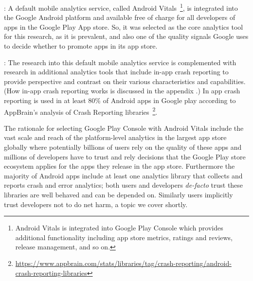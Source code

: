 : A default mobile analytics service, called Android Vitals~\footnote{Android Vitals is integrated into Google Play Console which provides additional functionality including app store metrics, ratings and reviews, release management, and so on.}, is integrated into the Google Android platform and available free of charge for all developers of apps in the Google Play App store. So, it was selected as the core analytics tool for this research, as it is prevalent, and also one of the quality signals Google uses to decide whether to promote apps in its app store. %

: The research into this default mobile analytics service is complemented with research in additional analytics tools that include in-app crash reporting to provide perspective and contrast on their various characteristics and capabilities. (How in-app crash reporting works is discussed in the appendix \href{{app:crash-recording-and-reporting-in-android}}{}.) In app crash reporting is used in at least 80\% of Android apps in Google play according to AppBrain's analysis of Crash Reporting libraries~\footnote{\url{https://www.appbrain.com/stats/libraries/tag/crash-reporting/android-crash-reporting-libraries}}.


The rationale for selecting Google Play Console with Android Vitals include the vast scale and reach of the platform-level analytics in the largest app store globally where potentially billions of users rely on the quality of these apps and millions of developers have to trust and rely decisions that the Google Play store ecosystem applies for the apps they release in the app store. Furthermore the majority of Android apps include at least one analytics library that collects and reports crash and error analytics; both users and developers \emph{de-facto} trust these libraries are well behaved and can be depended on. Similarly users implicitly trust developers not to do net harm, a topic we cover shortly. %





